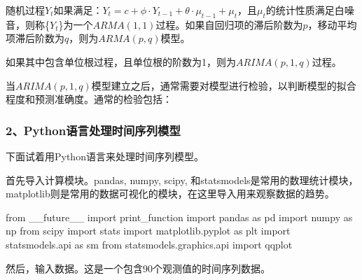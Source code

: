 \documentclass[]{article}
\newenvironment{Shaded}{}{}
\newcommand{\ImportTok}[1]{#1}
\newcommand{\NormalTok}[1]{#1}
\begin{document}
随机过程\({Y_t}\)如果满足：\(Y_t = c+\phi \cdot Y_{t-1}+ \theta \cdot \mu_{t-1} + \mu_t\)，且\(\mu_t\)的统计性质满足白噪音，则称\{\(Y_t\)\}为一个\(ARMA(1,1)\)过程。如果自回归项的滞后阶数为\(p\)，移动平均项滞后阶数为\(q\)，则为\(ARMA(p,q)\)模型。

如果其中包含单位根过程，且单位根的阶数为1，则为\(ARIMA(p,1,q)\)过程。

当\(ARIMA(p,1,q)\)模型建立之后，通常需要对模型进行检验，以判断模型的拟合程度和预测准确度。通常的检验包括：

\subsubsection{2、Python语言处理时间序列模型}\label{header-c166}

下面试着用Python语言来处理时间序列模型。

首先导入计算模块。pandas, numpy, scipy,
和statsmodels是常用的数理统计模块，matplotlib则是常用的数据可视化的模块，在这里导入用来观察数据的趋势。

\begin{Shaded}
\begin{Highlighting}[]
\ImportTok{from}\NormalTok{ __future__ }\ImportTok{import}\NormalTok{ print_function}
\ImportTok{import}\NormalTok{ pandas }\ImportTok{as}\NormalTok{ pd}
\ImportTok{import}\NormalTok{ numpy }\ImportTok{as}\NormalTok{ np}
\ImportTok{from}\NormalTok{ scipy }\ImportTok{import}\NormalTok{  stats}
\ImportTok{import}\NormalTok{ matplotlib.pyplot }\ImportTok{as}\NormalTok{ plt}
\ImportTok{import}\NormalTok{ statsmodels.api }\ImportTok{as}\NormalTok{ sm}
\ImportTok{from}\NormalTok{ statsmodels.graphics.api }\ImportTok{import}\NormalTok{ qqplot}
\end{Highlighting}
\end{Shaded}

然后，输入数据。这是一个包含90个观测值的时间序列数据。
\end{document}
